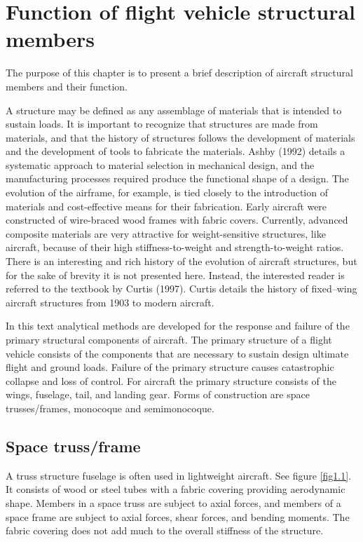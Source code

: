 \documentclass{AeroStructure-ERJohnson}
\begin{document}
\mainmatter

\chapter{Function of flight vehicle structural members}\label{ch1}

The purpose of this chapter is to present a brief description of aircraft
structural members and their function.


A structure may be defined as any assemblage of materials that is intended
to sustain loads. It is important to recognize that structures are made from
materials, and that the history of structures follows the development of
materials and the development of tools to fabricate the materials. Ashby
(1992) details a systematic approach to material selection in mechanical
design, and the manufacturing processes required produce the functional
shape of a design. The evolution of the airframe, for example, is tied
closely to the introduction of materials and cost-effective means for their
fabrication. Early aircraft were constructed of wire-braced wood frames with
fabric covers. Currently, advanced composite materials are very attractive
for weight-sensitive structures, like aircraft, because of their high
stiffness-to-weight and strength-to-weight ratios. There is an interesting
and rich history of the evolution of aircraft structures, but for the sake
of brevity it is not presented here. Instead, the interested reader is
referred to the textbook by Curtis (1997). Curtis details the history of
fixed--wing aircraft structures from 1903 to modern aircraft.


In this text analytical methods are developed for the response and failure
of the primary structural components of aircraft. The primary structure of a
flight vehicle consists of the components that are necessary to sustain
design ultimate flight and ground loads. Failure of the primary structure
causes catastrophic collapse and loss of control. For aircraft the primary
structure consists of the wings, fuselage, tail, and landing gear. Forms of
construction are space trusses/frames, monocoque and semimonocoque.


\section{Space truss/frame}

A truss structure fuselage is often used in lightweight aircraft.
See figure \ref{fig1.1}. It consists of wood or steel tubes with a fabric
covering providing aerodynamic shape. Members in a space truss are
subject to axial forces, and members of a space frame are subject
to axial forces, shear forces, and bending moments. The fabric
covering does not add much to the overall stiffness of the
structure.
\end{document}
